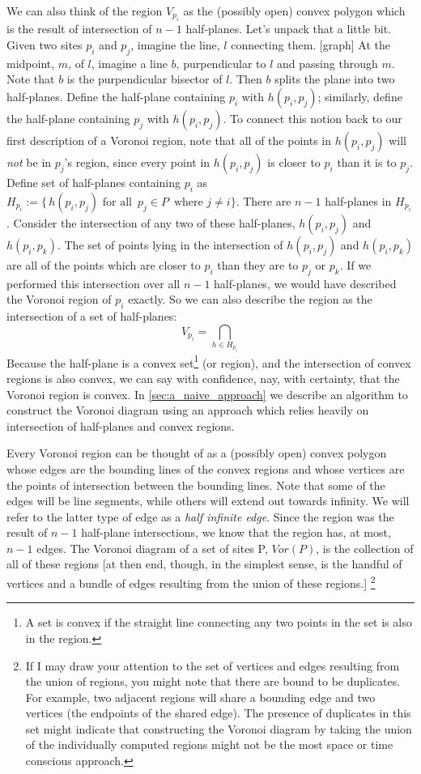 \documentclass[12pt,twoside]{reedthesis}
\begin{document}
  We can also think of the region $V_{p_{i}}$ as the (possibly open) convex polygon which is the result of intersection of $n-1$ half-planes. Let's unpack that a little bit. Given two sites $p_{i}$ and $p_{j}$, imagine the line, $l$ connecting them. [graph] At the midpoint, $m$, of $l$, imagine a line $b$, purpendicular to $l$ and passing through $m$. Note that $b$ is the purpendicular bisector of $l$. Then $b$ splits the plane into two half-planes. Define the half-plane containing $p_{i}$ with $h(p_{i}, p_{j})$; similarly, define the half-plane containing $p_{j}$ with $h(p_{i}, p_{j})$. To connect this notion back to our first description of a Voronoi region, note that all of the points in $h(p_{i}, p_{j})$ will \emph{not} be in $p_{j}$'s region, since every point in $h(p_{i}, p_{j})$ is closer to $p_{i}$ than it is to $p_{j}$. Define set of half-planes containing $p_{i}$ as $H_{p_{i}} := \{\,h(p_{i}, p_{j}) \text{ for all }\, p_{j}\in P\,\text{ where }j\neq i \}$. There are $n-1$ half-planes in $H_{p_{i}}$. Consider the intersection of any two of these half-planes, $h(p_{i}, p_{j})$ and $h(p_{i}, p_{k})$. The set of points lying in the intersection of $h(p_{i}, p_{j})$ and $h(p_{i}, p_{k})$ are all of the points which are closer to $p_{i}$ than they are to $p_{j}$ or $p_{k}$. If we performed this intersection over all $n-1$ half-planes, we would have described the Voronoi region of $p_{i}$ exactly. So we can also describe the region as the intersection of a set of half-planes:
  $$V_{p_{i}} = \bigcap_{h \in H_{p_{i}}}$$ 
  Because the half-plane is a convex set\footnote{A set is convex if the straight line connecting any two points in the set is also in the region.} (or region), and the intersection of convex regions is also convex, we can say with confidence, nay, with certainty, that the Voronoi region is convex. In \cref{sec:a_naive_approach} we describe an algorithm to construct the Voronoi diagram using an approach which relies heavily on intersection of half-planes and convex regions.\par
  Every Voronoi region can be thought of as a (possibly open) convex polygon whose edges are the bounding lines of the convex regions and whose vertices are the points of intersection between the bounding lines. Note that some of the edges will be line segments, while others will extend out towards infinity. We will refer to the latter type of edge as a \emph{half infinite edge}. Since the region was the result of $n-1$ half-plane intersections, we know that the region has, at most, $n-1$ edges. The Voronoi diagram of a set of sites P, $Vor(P)$, is the collection of all of these regions [at then end, though, in the simplest sense, is the handful of vertices and a bundle of edges resulting from the union of these regions.] \footnote{If I may draw your attention to the set of vertices and edges resulting from the union of regions, you might note that there are bound to be duplicates. For example, two adjacent regions will share a bounding edge and two vertices (the endpoints of the shared edge). The presence of duplicates in this set might indicate that constructing the Voronoi diagram by taking the union of the individually computed regions might not be the most space or time conscious approach.}\par
\end{document}
